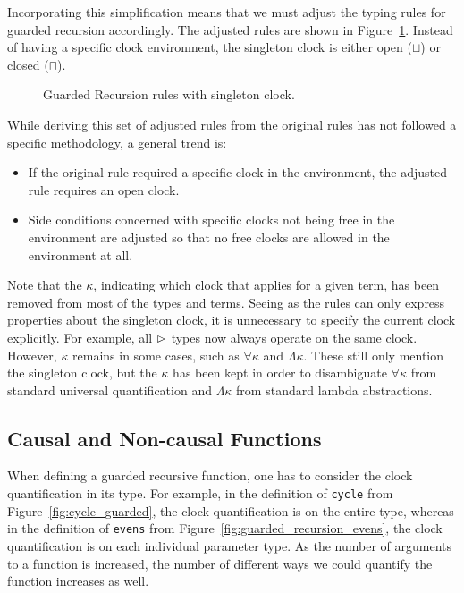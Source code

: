 Incorporating this simplification means that we must adjust the typing rules for
guarded recursion accordingly. The adjusted rules are shown in
Figure~\ref{fig:gr_rules_sin_clock}. Instead of having a specific clock
environment, the singleton clock is either open ($\sqcup$) or closed ($\sqcap$). 

\begin{figure}[h]
  
  \caption{Guarded Recursion rules with singleton clock.}
  \label{fig:gr_rules_sin_clock}
\end{figure}

While deriving this set of adjusted rules from the original rules has not followed a specific
methodology, a general trend is:

\begin{itemize}
\item If the original rule required a specific clock in the environment, the
  adjusted rule requires an open clock.
\item Side conditions concerned with specific clocks not being free in the
  environment are adjusted so that no free clocks are allowed in the
  environment at all.
\end{itemize}

Note that the $\kappa$, indicating which clock that applies for a given term,
has been removed from most of the types and terms. Seeing as the rules can only
express properties about the singleton clock, it is unnecessary to specify the
current clock explicitly. For example, all $\rhd$ types now always operate on the
same clock. However, $\kappa$ remains in some cases, such as $\forall \kappa$ and
$\Lambda \kappa$. These still only mention the singleton clock, but the
$\kappa$ has been kept in order to disambiguate $\forall \kappa$ from standard universal quantification and
$\Lambda \kappa$ from standard lambda abstractions.

\subsection{Causal and Non-causal Functions}
\label{sec:causal-non-causal}
When defining a guarded recursive function, one has to consider the clock
quantification in its type. For example, in the definition of \texttt{cycle}
from Figure~\ref{fig:cycle_guarded}, the clock quantification is on
the entire type, whereas in the definition of \texttt{evens} from
Figure~\ref{fig:guarded_recursion_evens}, the clock quantification is on each
individual parameter type. As the number of arguments to a function is
increased, the number of different ways we could quantify the function increases
as well.

